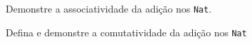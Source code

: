 \begin{exercise}
  Demonstre a associatividade da adi\c c\~ao nos \texttt{Nat}.
\end{exercise}

\begin{homework}
  Defina e demonstre a comutatividade da adi\c c\~ao nos \texttt{Nat}
\end{homework}
